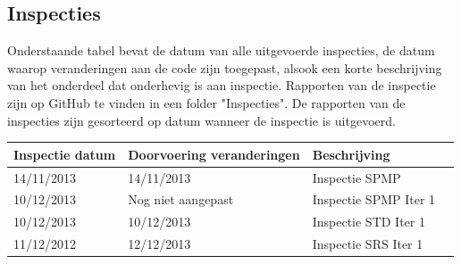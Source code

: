 \subsection{Inspecties}
Onderstaande tabel bevat de datum van alle uitgevoerde inspecties, de datum waarop veranderingen aan de code zijn toegepast, alsook een korte beschrijving van het onderdeel dat onderhevig is aan inspectie. Rapporten van de inspectie zijn op GitHub\cite{GitHubRepository} te vinden in een folder "Inspecties". De rapporten van de inspecties zijn gesorteerd op datum wanneer de inspectie is uitgevoerd.

\begin{center}
    \begin{tabular}{| l | l | l | l |}
    \hline
    Inspectie datum & Doorvoering veranderingen & Beschrijving \\ \hline
    14/11/2013 & 14/11/2013 & Inspectie SPMP \\ \hline
    10/12/2013 & Nog niet aangepast & Inspectie SPMP Iter 1 \\ \hline
    10/12/2013 & 10/12/2013 & Inspectie STD Iter 1 \\ \hline
    11/12/2012 & 12/12/2013 & Inspectie SRS Iter 1 \\ \hline
    
    \end{tabular}
\end{center}


